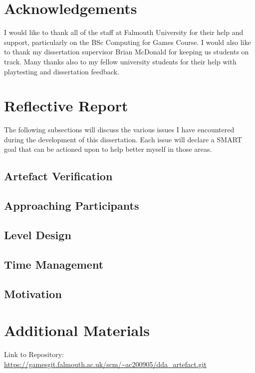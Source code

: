 \documentclass[journal]{IEEEtran}
\begin{document}

\appendices
\section{Acknowledgements}
I would like to thank all of the staff at Falmouth University for their help and support, particularly on the BSc Computing for Games Course. I would also like to thank my dissertation supervisor Brian McDonald for keeping us students on track. Many thanks also to my fellow university students for their help with playtesting and dissertation feedback.

\section{Reflective Report}
The following subsections will discuss the various issues I have encountered during the development of this dissertation. Each issue will declare a SMART goal that can be actioned upon to help better myself in those areas.

\subsection{Artefact Verification}

\subsection{Approaching Participants}

\subsection{Level Design}

\subsection{Time Management}

\subsection{Motivation}

\section{Additional Materials}

Link to Repository:
\url{https://gamesgit.falmouth.ac.uk/scm/~ac200905/dda_artefact.git}
\end{document}
